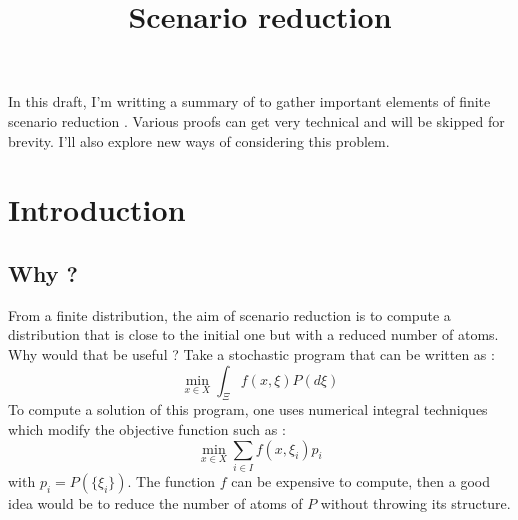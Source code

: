 \documentclass{amsart}
\title{Scenario reduction}
\begin{document}
\LinesNumbered
{}
\maketitle
In this draft, I'm writting a summary of \cite{rujeerapaiboon_scenario_2022} to gather important elements of finite scenario reduction . Various proofs can get very technical and will be skipped for brevity. I'll also explore new ways of considering this problem.

\section{Introduction}
\subsection{Why ?}
From a finite distribution, the aim of scenario reduction is to compute a distribution that is close to the initial one but with a reduced number of atoms. Why would that be useful ? Take a stochastic program that can be written as : 
$$
\min_{x\in X}\int_\Xi f\left(x,\xi\right)P\left(d\xi\right)
$$
To compute a solution of this program, one uses numerical integral techniques which modify the objective function such as :
$$
\min_{x\in X}\sum_{i\in I} f\left(x,\xi_i\right)p_i
$$
with $p_i=P\left(\{\xi_i\}\right)$. The function $f$ can be expensive to compute, then a good idea would be to reduce the number of atoms of $P$ without throwing its structure.
\end{document}

